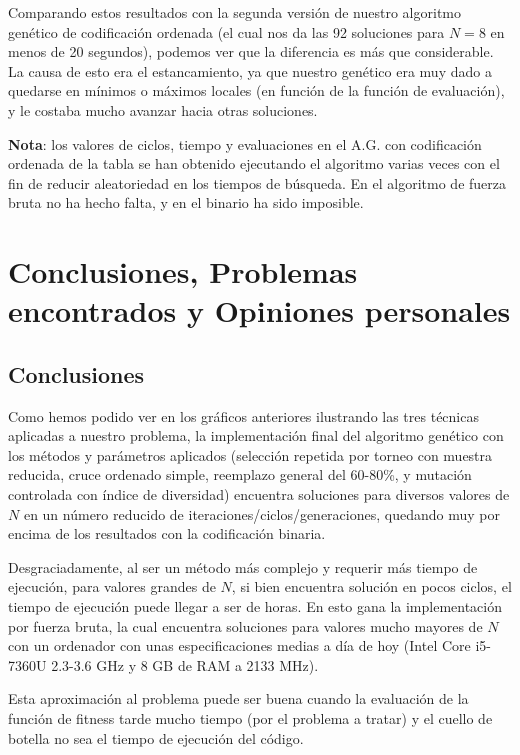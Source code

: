 \documentclass[12pt]{article}
\begin{document}
Comparando estos resultados con la segunda versión de nuestro algoritmo genético de codificación ordenada (el cual nos da las 92 soluciones para $N=8$ en menos de 20 segundos), podemos ver que la diferencia es más que considerable. La causa de esto era el estancamiento, ya que nuestro genético era muy dado a quedarse en mínimos o máximos locales (en función de la función de evaluación), y le costaba mucho avanzar hacia otras soluciones.

\textbf{Nota}: los valores de ciclos, tiempo y evaluaciones en el A.G. con codificación ordenada de la tabla se han obtenido ejecutando el algoritmo varias veces con el fin de reducir aleatoriedad en los tiempos de búsqueda. En el algoritmo de fuerza bruta no ha hecho falta, y en el binario ha sido imposible.

\clearpage\newpage

\section{Conclusiones, Problemas encontrados y Opiniones personales}

\subsection{Conclusiones}

Como hemos podido ver en los gráficos anteriores ilustrando las tres técnicas aplicadas a nuestro problema, la implementación final del algoritmo genético con los métodos y parámetros aplicados (selección repetida por torneo con muestra reducida, cruce ordenado simple, reemplazo general del 60-80\%, y mutación controlada con índice de diversidad) encuentra soluciones para diversos valores de $N$ en un número reducido de iteraciones/ciclos/generaciones, quedando muy por encima de los resultados con la codificación binaria.

Desgraciadamente, al ser un método más complejo y requerir más tiempo de ejecución, para valores grandes de $N$, si bien encuentra solución en pocos ciclos, el tiempo de ejecución puede llegar a ser de horas. En esto gana la implementación por fuerza bruta, la cual encuentra soluciones para valores mucho mayores de $N$ con un ordenador con unas especificaciones medias a día de hoy (Intel Core i5-7360U 2.3-3.6 GHz y 8 GB de RAM a 2133 MHz).

Esta aproximación al problema puede ser buena cuando la evaluación de la función de fitness tarde mucho tiempo (por el problema a tratar) y el cuello de botella no sea el tiempo de ejecución del código.
\end{document}
